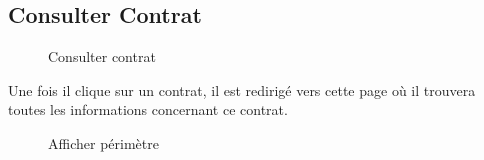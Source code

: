 \documentclass[a4paper]{report}
\begin{document}
\begin{doublespace}
\subsection{Consulter Contrat}
\begin{figure}[H]
	\begin{center}
		\caption{Consulter contrat}
	\end{center}
\end{figure}
Une fois il clique sur un contrat, il est redirigé vers cette page où il trouvera toutes les informations concernant ce contrat.
\begin{figure}[H]
	\begin{center}
		\caption{Afficher périmètre}
	\end{center}
\end{figure}

\end{doublespace}
\end{document}
